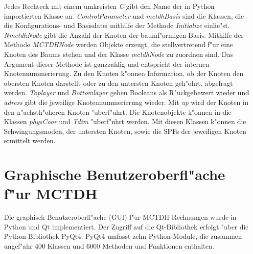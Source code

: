 Jedes Rechteck mit einem umkreisten \textit{C} gibt den Name der in Python importierten Klasse an. 
\textit{ControlParameter} und \textit{mctdhBasis} sind die Klassen, die die Konfigurations- und Basisdatei mithilfe der Methode
\textit{Initialize} einlie"st. \textit{NmctdhNode} gibt die Anzahl der Knoten der baumf"ormigen Basis.
Mithilfe der Methode \textit{MCTDHNode} werden Objekte erzeugt, die stellvertretend f"ur eine Knoten des Baums stehen
und der Klasse \textit{mctdhNode} zu zuordnen sind. Das Argument dieser Methode ist ganzzahlig und entspricht der internen Knotennummerierung.
Zu den Knoten k"onnen Information, ob der Knoten den obersten Knoten darstellt oder zu den untersten Knoten geh"ohrt, abgefragt werden.
\textit{Toplayer} und \textit{Bottomlayer} geben Booleans als R"uckgebewert wieder und \textit{adress} gibt die jeweilige Knotennummerierung 
wieder. Mit \textit{up} wird der Knoten in den n"achsth"oheren Knoten "uberf"uhrt.
Die Knotenobjekte k"onnen in die Klassen \textit{physCoor} und \textit{Tdim} "uberf"uhrt werden. Mit diesen Klassen k"onnen
die Schwingungsmoden, der untersten Knoten, sowie die SPFs der jeweiligen Knoten ermittelt werden. 





\section{Graphische Benutzeroberfl"ache f"ur MCTDH}

 Die graphisch Benutzeroberfl"ache (GUI) f"ur MCTDH-Rechnungen wurde in Python und Qt implementiert.
 Der Zugriff auf die Qt-Bibliothek erfolgt "uber die Python-Bibliothek PyQt4. 
 PyQt4 umfasst zehn Python-Module, die zusammen ungef"ahr 400 Klassen und 6000 Methoden und Funktionen enthalten. \cite{PyQt}

